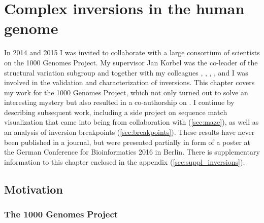 \chapter{Complex inversions in the human genome}
\label{sec:complex_invs}


In 2014 and 2015 I was invited to collaborate with a large consortium of
scientists on the 1000 Genomes Project. My supervisor Jan Korbel was the
co-leader of the structural variation subgroup and together with my colleagues
\tobias, \adrian, \benjamin, \markus, and \andreas
I was involved in the validation and characterization of inversions.
This chapter covers my work for the 1000 Genomes Project, which not only turned
out to solve an interesting mystery but also resulted in a co-authorship on
\cite{Sudmant2015}. I continue by describing subsequent work, including a side
project on sequence match visualization that came into being from collaboration
with \markus (\cref{sec:maze}), as well as an analysis of inversion breakpoints
(\cref{sec:breakpoints}). These results have never been published in a journal,
but were presented partially in form of a poster at the German Conference for
Bioinformatics 2016 in Berlin. There is supplementary information to this
chapter enclosed in the appendix (\cref{sec:suppl_inversions}).




\section{Motivation}
\subsection{The 1000 Genomes Project}
\label{sec:1000G}


